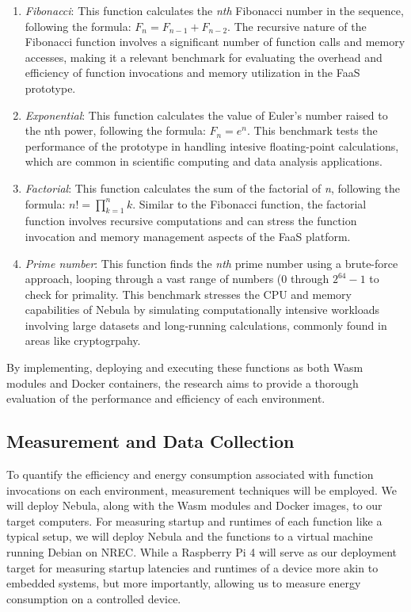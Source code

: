 \documentclass[
  table]{report}
\providecommand{\tightlist}{%
  \setlength{\itemsep}{0pt}\setlength{\parskip}{0pt}}
\begin{document}
\begin{enumerate}
\def\labelenumi{\arabic{enumi}.}
\tightlist
\item
  \emph{Fibonacci}: This function calculates the \emph{nth} Fibonacci
  number in the sequence, following the formula:
  \(F_n = F_{n-1} + F_{n-2}\). The recursive nature of the Fibonacci
  function involves a significant number of function calls and memory
  accesses, making it a relevant benchmark for evaluating the overhead
  and efficiency of function invocations and memory utilization in the
  \ac{FaaS} prototype.
\item
  \emph{Exponential}: This function calculates the value of Euler's
  number raised to the nth power, following the formula: \(F_n = e^n\).
  This benchmark tests the performance of the prototype in handling
  intesive floating-point calculations, which are common in scientific
  computing and data analysis applications.
\item
  \emph{Factorial}: This function calculates the sum of the factorial of
  \emph{n}, following the formula: \(n! = \prod_{k=1}^n k\). Similar to
  the Fibonacci function, the factorial function involves recursive
  computations and can stress the function invocation and memory
  management aspects of the \ac{FaaS} platform.
\item
  \emph{Prime number}: This function finds the \emph{nth} prime number
  using a brute-force approach, looping through a vast range of numbers
  (0 through \(2^{64} - 1\) to check for primality. This benchmark
  stresses the CPU and memory capabilities of Nebula by simulating
  computationally intensive workloads involving large datasets and
  long-running calculations, commonly found in areas like cryptogrpahy.
\end{enumerate}

By implementing, deploying and executing these functions as both
\ac{Wasm} modules and Docker containers, the research aims to provide a
thorough evaluation of the performance and efficiency of each
environment.

\subsection{Measurement and Data Collection}
\label{sect:measure_data_collect}

To quantify the efficiency and energy consumption associated with
function invocations on each environment, measurement techniques will be
employed. We will deploy Nebula, along with the \ac{Wasm} modules and
Docker images, to our target computers. For measuring startup and
runtimes of each function like a typical setup, we will deploy Nebula
and the functions to a virtual machine running Debian on \ac{NREC}.
While a Raspberry Pi 4 will serve as our deployment target for measuring
startup latencies and runtimes of a device more akin to embedded
systems, but more importantly, allowing us to measure energy consumption
on a controlled device.
\end{document}
